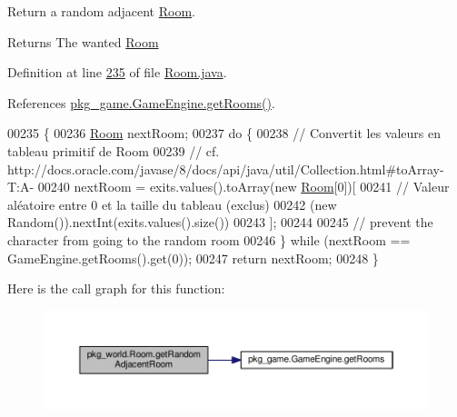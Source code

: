 Return a random adjacent \hyperlink{classpkg__world_1_1Room}{Room}. 

\begin{DoxyReturn}{Returns}
The wanted \hyperlink{classpkg__world_1_1Room}{Room} 
\end{DoxyReturn}


Definition at line \hyperlink{Room_8java_source_l00235}{235} of file \hyperlink{Room_8java_source}{Room.\-java}.



References \hyperlink{GameEngine_8java_source_l00306}{pkg\-\_\-game.\-Game\-Engine.\-get\-Rooms()}.


\begin{DoxyCode}
00235                                         \{
00236         \hyperlink{classpkg__world_1_1Room_ae48ca6830c8c9368ab1cb7e9b006d157}{Room} nextRoom;
00237         \textcolor{keywordflow}{do} \{
00238             \textcolor{comment}{// Convertit les valeurs en tableau primitif de Room}
00239             \textcolor{comment}{// cf. http://docs.oracle.com/javase/8/docs/api/java/util/Collection.html#toArray-T:A-}
00240             nextRoom = exits.values().toArray(\textcolor{keyword}{new} \hyperlink{classpkg__world_1_1Room_ae48ca6830c8c9368ab1cb7e9b006d157}{Room}[0])[
00241                 \textcolor{comment}{// Valeur aléatoire entre 0 et la taille du tableau (exclus)}
00242                 (\textcolor{keyword}{new} Random()).nextInt(exits.values().size())
00243                 ];
00244 
00245             \textcolor{comment}{// prevent the character from going to the random room}
00246         \} \textcolor{keywordflow}{while} (nextRoom == GameEngine.getRooms().get(0));
00247         \textcolor{keywordflow}{return} nextRoom;
00248     \}
\end{DoxyCode}


Here is the call graph for this function\-:\nopagebreak
\begin{figure}[H]
\begin{center}
\leavevmode
\includegraphics[width=350pt]{classpkg__world_1_1Room_a00952ff3743ec6cd8d238dada7506f63_cgraph}
\end{center}
\end{figure}


